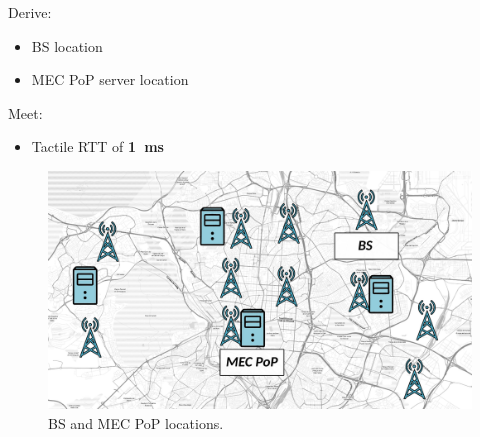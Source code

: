 \documentclass[aspectratio=169]{beamer}
\begin{document}
\begin{frame}
    \frametitle{\secname}
    \framesubtitle{\subsecname}
    \vfill
    \begin{minipage}{0.27\textwidth}
        Derive:
        \begin{itemize}
            \item BS location
            \item MEC PoP server location
        \end{itemize}
        Meet:
        \begin{itemize}
            \item Tactile RTT of \mbox{\textbf{1 ms}}
        \end{itemize}
    \end{minipage}
    \hfill
    \begin{minipage}{0.68\textwidth}
        \begin{figure}
            \centering
            \includegraphics[width=\textwidth]{img/pop-and-antennas.pdf}
            \caption{BS and MEC PoP locations.}
            \label{fig:bs-pop-locations}
        \end{figure}
    \end{minipage}
    \vfill
\end{frame}
\end{document}
